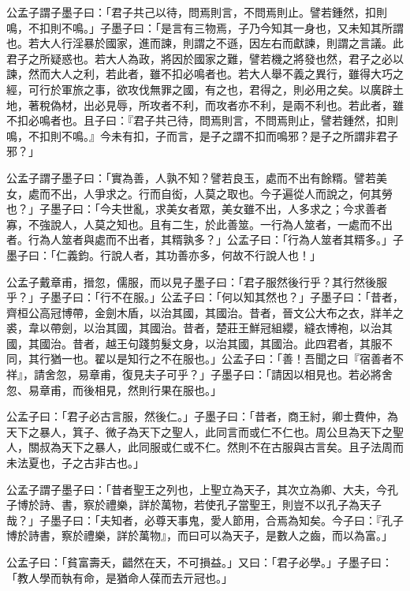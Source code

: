 
\begin{pinyinscope}
公孟子謂子墨子曰：「君子共己以待，問焉則言，不問焉則止。譬若鍾然，扣則鳴，不扣則不鳴。」子墨子曰：「是言有三物焉，子乃今知其一身也，又未知其所謂也。若大人行淫暴於國家，進而諫，則謂之不遜，因左右而獻諫，則謂之言議。此君子之所疑惑也。若大人為政，將因於國家之難，譬若機之將發也然，君子之必以諫，然而大人之利，若此者，雖不扣必鳴者也。若大人舉不義之異行，雖得大巧之經，可行於軍旅之事，欲攻伐無罪之國，有之也，君得之，則必用之矣。以廣辟土地，著稅偽材，出必見辱，所攻者不利，而攻者亦不利，是兩不利也。若此者，雖不扣必鳴者也。且子曰：『君子共己待，問焉則言，不問焉則止，譬若鍾然，扣則鳴，不扣則不鳴。』今未有扣，子而言，是子之謂不扣而鳴邪？是子之所謂非君子邪？」

公孟子謂子墨子曰：「實為善，人孰不知？譬若良玉，處而不出有餘糈。譬若美女，處而不出，人爭求之。行而自衒，人莫之取也。今子遍從人而說之，何其勞也？」子墨子曰：「今夫世亂，求美女者眾，美女雖不出，人多求之；今求善者寡，不強說人，人莫之知也。且有二生，於此善筮。一行為人筮者，一處而不出者。行為人筮者與處而不出者，其糈孰多？」公孟子曰：「行為人筮者其糈多。」子墨子曰：「仁義鈞。行說人者，其功善亦多，何故不行說人也！」

公孟子戴章甫，搢忽，儒服，而以見子墨子曰：「君子服然後行乎？其行然後服乎？」子墨子曰：「行不在服。」公孟子曰：「何以知其然也？」子墨子曰：「昔者，齊桓公高冠博帶，金劍木盾，以治其國，其國治。昔者，晉文公大布之衣，牂羊之裘，韋以帶劍，以治其國，其國治。昔者，楚莊王鮮冠組纓，縫衣博袍，以治其國，其國治。昔者，越王句踐剪髮文身，以治其國，其國治。此四君者，其服不同，其行猶一也。翟以是知行之不在服也。」公孟子曰：「善！吾聞之曰『宿善者不祥』，請舍忽，易章甫，復見夫子可乎？」子墨子曰：「請因以相見也。若必將舍忽、易章甫，而後相見，然則行果在服也。」

公孟子曰：「君子必古言服，然後仁。」子墨子曰：「昔者，商王紂，卿士費仲，為天下之暴人，箕子、微子為天下之聖人，此同言而或仁不仁也。周公旦為天下之聖人，關叔為天下之暴人，此同服或仁或不仁。然則不在古服與古言矣。且子法周而未法夏也，子之古非古也。」

公孟子謂子墨子曰：「昔者聖王之列也，上聖立為天子，其次立為卿、大夫，今孔子博於詩、書，察於禮樂，詳於萬物，若使孔子當聖王，則豈不以孔子為天子哉？」子墨子曰：「夫知者，必尊天事鬼，愛人節用，合焉為知矣。今子曰：『孔子博於詩書，察於禮樂，詳於萬物』，而曰可以為天子，是數人之齒，而以為富。」

公孟子曰：「貧富壽夭，齰然在天，不可損益。」又曰：「君子必學。」子墨子曰：「教人學而執有命，是猶命人葆而去亓冠也。」


\end{pinyinscope}
